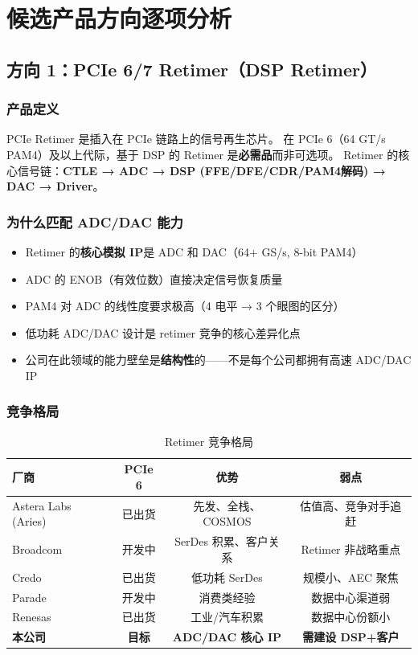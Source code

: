 \documentclass[11pt,a4paper]{ctexart}
\begin{document}
\section{候选产品方向逐项分析}

\subsection{方向 1：PCIe 6/7 Retimer（DSP Retimer）}

\subsubsection{产品定义}
PCIe Retimer 是插入在 PCIe 链路上的信号再生芯片。
在 PCIe 6（64 GT/s PAM4）及以上代际，基于 DSP 的 Retimer 是\textbf{必需品}而非可选项。
Retimer 的核心信号链：\textbf{CTLE → ADC → DSP (FFE/DFE/CDR/PAM4解码) → DAC → Driver}。

\subsubsection{为什么匹配 ADC/DAC 能力}

\begin{itemize}
    \item Retimer 的\textbf{核心模拟 IP}是 ADC 和 DAC（64+ GS/s, 8-bit PAM4）
    \item ADC 的 ENOB（有效位数）直接决定信号恢复质量
    \item PAM4 对 ADC 的线性度要求极高（4 电平 → 3 个眼图的区分）
    \item 低功耗 ADC/DAC 设计是 retimer 竞争的核心差异化点
    \item 公司在此领域的能力壁垒是\textbf{结构性}的——不是每个公司都拥有高速 ADC/DAC IP
\end{itemize}

\subsubsection{竞争格局}

\begin{table}[htb]
    \centering
    \caption{Retimer 竞争格局}
    \label{tab:retimer-comp}
    \begin{tabular}{lccc}
        \toprule
        \textbf{厂商} & \textbf{PCIe 6} & \textbf{优势} & \textbf{弱点} \\
        \midrule
        Astera Labs (Aries) & 已出货 & 先发、全栈、COSMOS & 估值高、竞争对手追赶 \\
        Broadcom & 开发中 & SerDes 积累、客户关系 & Retimer 非战略重点 \\
        Credo & 已出货 & 低功耗 SerDes & 规模小、AEC 聚焦 \\
        Parade & 开发中 & 消费类经验 & 数据中心渠道弱 \\
        Renesas & 已出货 & 工业/汽车积累 & 数据中心份额小 \\
        \rowcolor{highlight}
        \textbf{本公司} & \textbf{目标} & \textbf{ADC/DAC 核心 IP} & \textbf{需建设 DSP+客户} \\
        \bottomrule
    \end{tabular}
\end{table}
\end{document}
